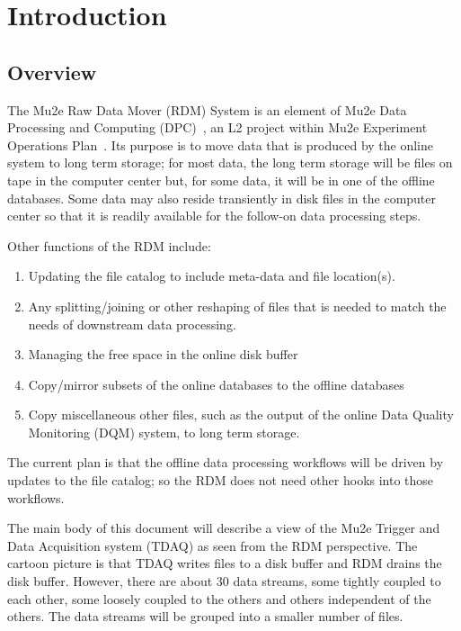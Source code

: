 \chapter{Introduction}
\label{ch:intro}

\section{Overview}
\label{sec:overview}

The Mu2e Raw Data Mover (RDM) System is an element of Mu2e Data Processing
and Computing (DPC)~\cite{DPC}, an L2 project within Mu2e Experiment Operations Plan~\cite{PEOP}.
Its purpose is to move data
that is produced by the online system to long term storage;
for most data, the long term storage will be files on tape in the computer center
but, for some data, it will be in one of the offline databases.
Some data may also reside transiently in disk files in the computer center so that
it is readily available for the follow-on data processing steps.

Other functions of the RDM include:
\begin{enumerate}
\item Updating the file catalog to include meta-data and file location(s).
\item Any splitting/joining or other reshaping of files that is needed to match the needs of downstream data processing.
\item Managing the free space in the online disk buffer
\item Copy/mirror subsets of the online databases to the offline databases
\item Copy miscellaneous other files, such as the output of the online Data Quality Monitoring (DQM) system, to long term storage.
\end{enumerate}

The current plan is that the offline data processing workflows will be driven by updates to the file catalog;
so the RDM does not need other hooks into those workflows.



The main body of this document will describe a view of the
Mu2e Trigger and Data Acquisition system (TDAQ) as seen from the RDM perspective.
The cartoon picture is that TDAQ writes files to a disk buffer and RDM drains the disk buffer.
However, there are about 30 data streams, some tightly coupled to each
other, some loosely coupled to the others and others independent of the others.
The data streams will be grouped into a smaller number of files.

